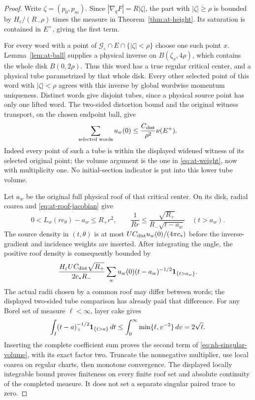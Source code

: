 \begin{proof}
Write $\zeta=(p_0,p_m)$.  Since $|\nabla_qF|=R|\zeta|$,
the part with $|\zeta|\ge\rho$ is bounded by
$H_\varepsilon/(R_-\rho)$ times the measure in
Theorem~\ref{thm:at-height}.  Its saturation is contained in
$E^+$, giving the first term.

For every word with a point of
$\mathcal G_\varepsilon\cap E\cap\{|\zeta|<\rho\}$ choose
one such point $x$.  Lemma~\ref{lem:at-ball} supplies a physical
inverse on $B(\zeta_x,4\rho)$, which contains the whole disk
$B(0,2\rho)$.  Thus this word has a true regular critical
center, and a physical tube parametrized by that whole disk.
Every other selected point of this word with $|\zeta|<\rho$
agrees with this inverse by global wordwise momentum uniqueness.
Distinct words give disjoint tubes, since a physical source
point has only one lifted word.  The two-sided distortion bound
and the original witness transport, on the chosen endpoint
ball, give
\[
  \sum_{\text{selected words}}u_w(0)
                 \le\frac{C_{\rm dist}}{\rho^2}\nu(E^+).
\]
Indeed every point of such a tube is within the displayed
widened witness of its selected original point; the volume
argument is the one in \eqref{eq:at-weight}, now with
multiplicity one.  No initial-section indicator is put into
this lower tube volume.

Let $a_w$ be the original full physical roof of that critical
center.  On its disk, radial coarea and
\eqref{eq:at-roof-jacobian} give
\[
 0<L_w(re_\theta)-a_w\le R_+r^2,\qquad
 \frac1{Rr}\le
     \frac{\sqrt{R_+}}{R_-\sqrt{t-a_w}}\quad(t>a_w).
\]
The source density in $(t,\theta)$ is at most
$U C_{\rm dist}u_w(0)/(4\pi c_*)$ before the inverse-gradient
and incidence weights are inserted.  After integrating the
angle, the positive roof density is consequently bounded by
\[
 \frac{H_\varepsilon U C_{\rm dist}\sqrt{R_+}}{2c_*R_-}
       \sum_w u_w(0)(t-a_w)^{-1/2}\mathbf1_{\{t>a_w\}}.
\]
The actual radii chosen by a common roof may differ between
words; the displayed two-sided tube comparison has already
paid that difference.
For any Borel set of measure $\ell<\infty$, layer cake gives
\[
 \int_I(t-a)_+^{-1/2}\mathbf1_{\{t>a\}}\,dt
 \le\int_0^\infty\min\{\ell,v^{-2}\}\,dv
 =2\sqrt\ell.
\]
Inserting the complete coefficient sum proves the second term
of \eqref{eq:nh-singular-volume}, with its exact factor two.
Truncate the nonnegative multiplier, use local coarea on
regular charts, then monotone convergence.  The displayed
locally integrable bound proves finiteness on every finite
roof set and absolute continuity of the completed measure.
It does not set a separate singular paired trace to zero.
\end{proof}

